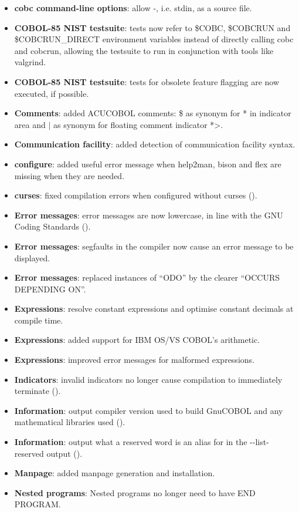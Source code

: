 \begin{itemize}
\item \textbf{cobc command-line options}: allow -, i.e. stdin, as a source file.
\item \textbf{COBOL-85 NIST testsuite}: tests now refer to \$COBC, \$COBCRUN and \$COBCRUN\_DIRECT environment variables instead of directly calling cobc and cobcrun, allowing the testsuite to run in conjunction with tools like valgrind.
\item \textbf{COBOL-85 NIST testsuite}: tests for obsolete feature flagging are now executed, if possible.
\item \textbf{Comments}: added ACUCOBOL comments: \$ as synonym for * in indicator area and $\vert$ as synonym for floating comment indicator *>.
\item \textbf{Communication facility}: added detection of communication facility syntax.
\item \textbf{configure}: added useful error message when help2man, bison and flex are missing when they are needed.
\item \textbf{curses}: fixed compilation errors when configured without curses ().
\item \textbf{Error messages}: error messages are now lowercase, in line with the GNU Coding Standards ().
\item \textbf{Error messages}: segfaults in the compiler now cause an error message to be displayed.
\item \textbf{Error messages}: replaced instances of ``ODO'' by the clearer ``OCCURS DEPENDING ON''.
\item \textbf{Expressions}: resolve constant expressions and optimise constant decimals at compile time.
\item \textbf{Expressions}: added support for IBM OS\slash{}VS COBOL's arithmetic.
\item \textbf{Expressions}: improved error messages for malformed expressions.
\item \textbf{Indicators}: invalid indicators no longer cause compilation to immediately terminate ().
\item \textbf{Information}: output compiler version used to build GnuCOBOL and any mathematical libraries used ().
\item \textbf{Information}: output what a reserved word is an alias for in the -{}-list-reserved output ().
\item \textbf{Manpage}: added manpage generation and installation.
\item \textbf{Nested programs}: Nested programs no longer need to have END PROGRAM.

\end{itemize}
